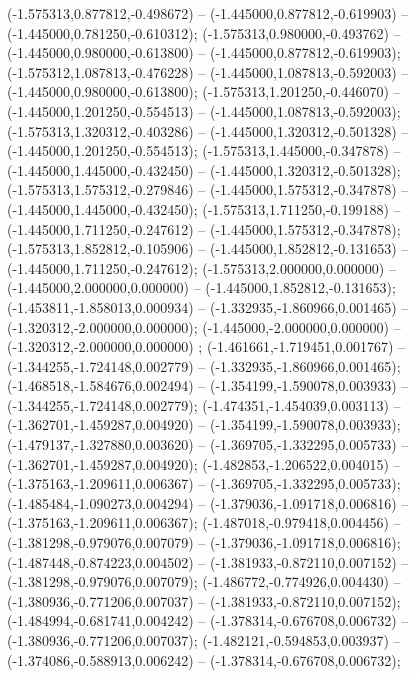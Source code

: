  (-1.575313,0.877812,-0.498672) -- (-1.445000,0.877812,-0.619903) -- (-1.445000,0.781250,-0.610312);
 (-1.575313,0.980000,-0.493762) -- (-1.445000,0.980000,-0.613800) -- (-1.445000,0.877812,-0.619903);
 (-1.575312,1.087813,-0.476228) -- (-1.445000,1.087813,-0.592003) -- (-1.445000,0.980000,-0.613800);
 (-1.575313,1.201250,-0.446070) -- (-1.445000,1.201250,-0.554513) -- (-1.445000,1.087813,-0.592003);
 (-1.575313,1.320312,-0.403286) -- (-1.445000,1.320312,-0.501328) -- (-1.445000,1.201250,-0.554513);
 (-1.575313,1.445000,-0.347878) -- (-1.445000,1.445000,-0.432450) -- (-1.445000,1.320312,-0.501328);
 (-1.575313,1.575312,-0.279846) -- (-1.445000,1.575312,-0.347878) -- (-1.445000,1.445000,-0.432450);
 (-1.575313,1.711250,-0.199188) -- (-1.445000,1.711250,-0.247612) -- (-1.445000,1.575312,-0.347878);
 (-1.575313,1.852812,-0.105906) -- (-1.445000,1.852812,-0.131653) -- (-1.445000,1.711250,-0.247612);
 (-1.575313,2.000000,0.000000) -- (-1.445000,2.000000,0.000000) -- (-1.445000,1.852812,-0.131653);
 (-1.453811,-1.858013,0.000934) -- (-1.332935,-1.860966,0.001465) -- (-1.320312,-2.000000,0.000000);
 (-1.445000,-2.000000,0.000000) -- (-1.320312,-2.000000,0.000000) ;
 (-1.461661,-1.719451,0.001767) -- (-1.344255,-1.724148,0.002779) -- (-1.332935,-1.860966,0.001465);
 (-1.468518,-1.584676,0.002494) -- (-1.354199,-1.590078,0.003933) -- (-1.344255,-1.724148,0.002779);
 (-1.474351,-1.454039,0.003113) -- (-1.362701,-1.459287,0.004920) -- (-1.354199,-1.590078,0.003933);
 (-1.479137,-1.327880,0.003620) -- (-1.369705,-1.332295,0.005733) -- (-1.362701,-1.459287,0.004920);
 (-1.482853,-1.206522,0.004015) -- (-1.375163,-1.209611,0.006367) -- (-1.369705,-1.332295,0.005733);
 (-1.485484,-1.090273,0.004294) -- (-1.379036,-1.091718,0.006816) -- (-1.375163,-1.209611,0.006367);
 (-1.487018,-0.979418,0.004456) -- (-1.381298,-0.979076,0.007079) -- (-1.379036,-1.091718,0.006816);
 (-1.487448,-0.874223,0.004502) -- (-1.381933,-0.872110,0.007152) -- (-1.381298,-0.979076,0.007079);
 (-1.486772,-0.774926,0.004430) -- (-1.380936,-0.771206,0.007037) -- (-1.381933,-0.872110,0.007152);
 (-1.484994,-0.681741,0.004242) -- (-1.378314,-0.676708,0.006732) -- (-1.380936,-0.771206,0.007037);
 (-1.482121,-0.594853,0.003937) -- (-1.374086,-0.588913,0.006242) -- (-1.378314,-0.676708,0.006732);
